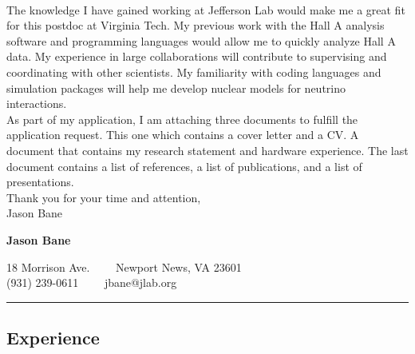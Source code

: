 \documentclass[12pt,letterpaper]{article}
\begin{document}
\paragraph{}The knowledge I have gained working at Jefferson Lab would make me a great fit for this postdoc at Virginia Tech. My previous work with the Hall A analysis software and programming languages would allow me to quickly analyze Hall A data. My experience in large collaborations will  contribute to supervising and coordinating with other scientists. My familiarity with coding languages and simulation packages will help me develop nuclear models for neutrino interactions.\\

As part of my application, I am attaching three documents to fulfill the application request. This one which contains a cover letter and a CV. A document that contains my research statement and hardware experience. The last document contains a list of references, a list of publications, and a list of presentations. \\

\noindent Thank you for your time and attention,\\
\noindent Jason Bane
\newpage




\begin{center}
{\LARGE \textbf{Jason Bane}}

18 Morrison Ave.\ \ \textbullet
\ \ Newport News, VA 23601 \\
(931) 239-0611\ \ \textbullet
\ \ jbane@jlab.org
\end{center}

\hrule
\vspace{-0.4em}
\subsection*{Experience}
\end{document}
